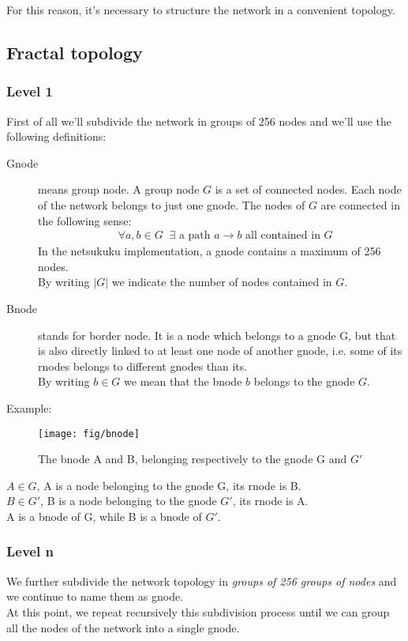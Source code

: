 \documentclass[a4paper]{article}
\newcommand{\T}[1]{\textrm{#1}}
\newcommand{\eal}[1]{{\begin{align*} #1 \end{align*}}}
\begin{document}
For this reason, it's necessary to structure the network in a convenient
topology.

\subsection{Fractal topology}
\label{sec:fractal_topology}
\subsubsection{Level 1}
First of all we'll subdivide the network in groups of 256 nodes and we'll use
the following definitions:
\label{gnodedef}
\begin{description}
	\item[Gnode] means group node. A group node $G$ is a set of connected
		nodes. Each node of the network belongs to just one gnode. The
		nodes of $G$ are connected in the following sense:
		\eal{&\forall a,b\in G\;\;\exists \T{ a path $a\rightarrow b$ all contained in $G$}}
		In the netsukuku implementation, a gnode contains a maximum of
		256 nodes.\\
		By writing $|G|$ we indicate the number of nodes contained in
		$G$.
	\item[Bnode] stands for border node. It is a node which belongs to a
		gnode G, but that is also directly linked to at least one node
		of another gnode, i.e. some of its rnodes belongs to different
		gnodes than its.\\
		By writing $b \in G$ we mean that the bnode $b$ belongs to the
		gnode $G$.
\end{description}

Example:\\
\begin{figure}[h]
	\begin{center}
		\texttt{[image: fig/bnode]}
	\end{center}
	\caption{The bnode A and B, belonging respectively to the gnode G and
	$G'$}
\end{figure}
$A \in G $, A is a node belonging to the gnode G, its rnode is B.\\
$B \in G'$, B is a node belonging to the gnode $G'$, its rnode is A.\\
A is a bnode of G, while B is a bnode of $G'$.

\subsubsection{Level n}
We further subdivide the network topology in \emph{groups of 256 groups of nodes}
and we continue to name them as gnode.\\
At this point, we repeat recursively this subdivision process until
we can group all the nodes of the network into a single gnode.
\end{document}

